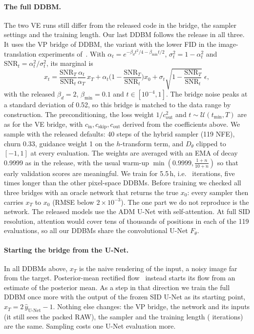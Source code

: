 \paragraph{The full DDBM.} The two VE runs still differ from the released code in the bridge, the sampler settings and the training length. Our last DDBM follows the release in all three. It uses the VP bridge of DDBM, the variant with the lower FID in the image-translation experiments of~\cite{zhou2024ddbm}. With $\alpha_t=e^{-\beta_d t^2/4-\beta_{\min}t/2}$, $\sigma_t^2=1-\alpha_t^2$ and $\mathrm{SNR}_t=\alpha_t^2/\sigma_t^2$, its marginal is
\begin{equation}
x_t = \frac{\mathrm{SNR}_T}{\mathrm{SNR}_t}\frac{\alpha_t}{\alpha_T}\,x_T + \alpha_t\Big(1-\frac{\mathrm{SNR}_T}{\mathrm{SNR}_t}\Big)x_0 + \sigma_t\sqrt{1-\frac{\mathrm{SNR}_T}{\mathrm{SNR}_t}}\;\epsilon,
\end{equation}
with the released $\beta_d=2$, $\beta_{\min}=0.1$ and $t\in[10^{-4},1]$. The bridge noise peaks at a standard deviation of 0.52, so this bridge is matched to the data range by construction. The preconditioning, the loss weight $1/c_{\text{out}}^2$ and $t\sim\mathcal U(t_{\min},T)$ are as for the VE bridge, with $c_{\text{in}},c_{\text{skip}},c_{\text{out}}$ derived from the coefficients above. We sample with the released defaults: 40 steps of the hybrid sampler (119 NFE), churn 0.33, guidance weight 1 on the $h$-transform term, and $D_\theta$ clipped to $[-1,1]$ at every evaluation. The weights are averaged with an EMA of decay 0.9999 as in the release, with the usual warm-up $\min(0.9999,\frac{1+n}{10+n})$ so that early validation scores are meaningful. We train for 5.5\,h, i.e.\ \VPITERS{} iterations, five times longer than the other pixel-space DDBMs. Before training we checked all three bridges with an oracle network that returns the true $x_0$: every sampler then carries $x_T$ to $x_0$ (RMSE below $2\times10^{-3}$). The one part we do not reproduce is the network. The released models use the ADM U-Net with self-attention. At full SID resolution, attention would cover tens of thousands of positions in each of the 119 evaluations, so all our DDBMs share the convolutional U-Net $F_\theta$.

\paragraph{Starting the bridge from the U-Net.} In all DDBMs above, $x_T$ is the naive rendering of the input, a noisy image far from the target. Posterior-mean rectified flow~\cite{ohayon2025pmrf} instead starts its flow from an estimate of the posterior mean. As a step in that direction we train the full DDBM once more with the output of the frozen SID U-Net as its starting point, $x_T=2\,\hat y_{\text{U-Net}}-1$. Nothing else changes: the VP bridge, the network and its inputs (it still sees the packed RAW), the sampler and the training length (\VPUITERS{} iterations) are the same. Sampling costs one U-Net evaluation more.

